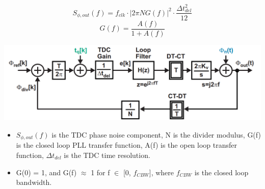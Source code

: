 \documentclass[10pt,a4paper]{article}
\begin{document}
		\begin{minipage}{5cm}
			\tiny
			\begin{equation}
				S_{\phi,out}(f)= f_{clk}\cdot\left| 2\pi NG(f) \right|^2\cdot\frac{\Delta t_{del}^2}{12}
			\end{equation}
			\begin{equation}
				G(f)= \frac{A(f)}{1 + A(f)}
			\end{equation}
		\end{minipage}
		\begin{minipage}{6cm}
			\center\includegraphics[width=1\textwidth, angle=0]{figs/pll_loop.png}
		\end{minipage}
 		\begin{itemize}
			\scriptsize
			\item $S_{\phi,out}(f)$ is the TDC phase noise component, N is the divider modulus, G(f) is the closed loop PLL transfer function, A(f) is the open loop transfer function, $\Delta t_{del}$ is the TDC time resolution.
			\item G(0) = 1, and G(f) $\approx$ 1 for f $\in$ [0, $f_{CBW}$], where $f_{CBW}$ is the closed loop bandwidth.

		\end{itemize}  
\end{document}
